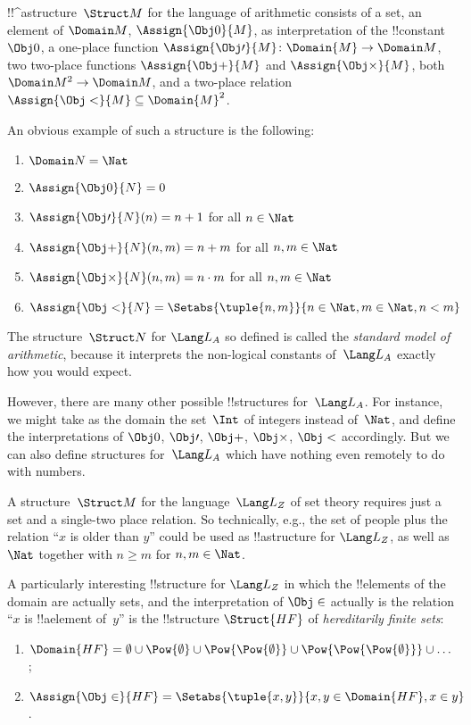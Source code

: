 \documentclass[../../include/open-logic-section]{subfiles}
\begin{document}
\begin{ex}
!!^a{structure}~$\Struct M$ for the language of arithmetic consists of a
  set, an element of $\Domain M$, $\Assign{\Obj 0}{M}$, as
  interpretation of the !!{constant}~$\Obj 0$, a one-place function
  $\Assign{\Obj \prime}{M} \colon \Domain{M} \to \Domain M$, two
  two-place functions $\Assign{\Obj +}{M}$ and $\Assign{\Obj
    \times}{M}$, both $\Domain M^2 \to \Domain M$, and a two-place
  relation $\Assign{\Obj <}{M} \subseteq \Domain{M}^2$.

An obvious example of such a structure is the following:
\begin{enumerate}
\item $\Domain N = \Nat$
\item $\Assign{\Obj 0}{N} = 0$
\item $\Assign{\Obj \prime}{N}(n) = n + 1$ for all $n \in \Nat$
\item $\Assign{\Obj +}{N}(n, m) = n + m$ for all $n, m \in \Nat$
\item $\Assign{\Obj \times}{N}(n, m) = n\cdot m$ for all $n, m \in \Nat$
\item $\Assign{\Obj <}{N} = \Setabs{\tuple{n, m}}{n \in \Nat, m \in
  \Nat, n < m}$
\end{enumerate}
The structure~$\Struct N$ for $\Lang L_A$ so defined is called the
\emph{standard model of arithmetic}, because it interprets the
non-logical constants of~$\Lang L_A$ exactly how you would expect.

However, there are many other possible !!{structure}s for~$\Lang
L_A$. For instance, we might take as the domain the set~$\Int$ of
integers instead of~$\Nat$, and define the interpretations of $\Obj
0$, $\Obj \prime$, $\Obj +$, $\Obj \times$, $\Obj <$ accordingly.  But
we can also define structures for~$\Lang L_A$ which have nothing even
remotely to do with numbers. 
\end{ex}

\begin{ex}
A structure~$\Struct M$ for the language~$\Lang L_Z$ of set theory requires
just a set and a single-two place relation. So technically, e.g., the
set of people plus the relation ``$x$ is older than $y$'' could be
used as !!a{structure} for $\Lang L_Z$, as well as $\Nat$ together
with $n \ge m$ for $n, m \in \Nat$.

A particularly interesting !!{structure} for $\Lang L_Z$ in which the
!!{element}s of the domain are actually sets, and the interpretation
of $\Obj \in$ actually is the relation ``$x$ is !!a{element} of~$y$''
is the !!{structure} $\Struct{{HF}}$ of \emph{hereditarily finite sets}:
\begin{enumerate}
\item $\Domain{{{HF}}} = \emptyset \cup \Pow{\emptyset} \cup
  \Pow{\Pow{\emptyset}} \cup \Pow{\Pow{\Pow{\emptyset}}} \cup \dots$;
\item $\Assign{\Obj \in}{{{HF}}} = \Setabs{\tuple{x, y}}{x, y \in
  \Domain{{{HF}}}, x \in y}$.
\end{enumerate}
\end{ex}
\end{document}
